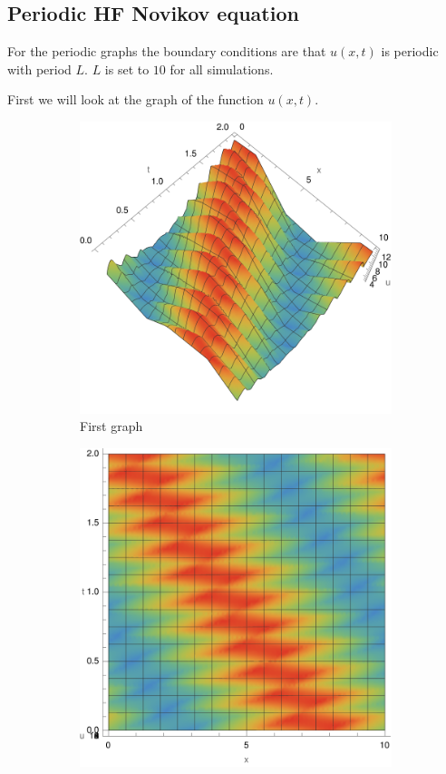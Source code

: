\documentclass[english,master]{liumaiex}
\theoremstyle{plain}
\theoremstyle{definition}
\begin{document}
\subsection{Periodic HF Novikov equation}

For the periodic graphs the boundary conditions are that $u(x,t)$ is periodic with period $L$. $L$ is set to $10$ for all simulations.

First we will look at the graph of the function $u(x, t)$.
\begin{figure}[H]
	\begin{subfigure}{0.44\textwidth}
		\includegraphics[width=\textwidth]{graphs/per2N/u3D.pdf}
        \caption{First graph}
    \end{subfigure}
	\hfill
	\begin{subfigure}{0.44\textwidth}
		\includegraphics[width=\textwidth]{graphs/per2N/u2D.pdf}

\end{subfigure}
\end{figure}
\end{document}
